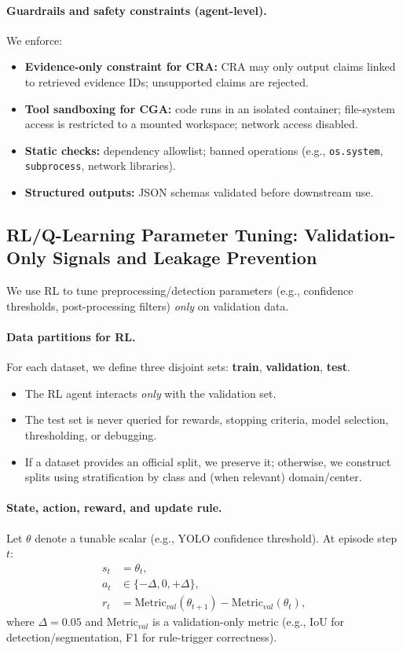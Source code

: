\documentclass{article}
\begin{document}
\paragraph{Guardrails and safety constraints (agent-level).}
We enforce:
\begin{itemize}
  \item \textbf{Evidence-only constraint for CRA:} CRA may only output claims linked to retrieved evidence IDs; unsupported claims are rejected.
  \item \textbf{Tool sandboxing for CGA:} code runs in an isolated container; file-system access is restricted to a mounted workspace; network access disabled.
  \item \textbf{Static checks:} dependency allowlist; banned operations (e.g., \texttt{os.system}, \texttt{subprocess}, network libraries).
  \item \textbf{Structured outputs:} JSON schemas validated before downstream use.
\end{itemize}

\subsection{RL/Q-Learning Parameter Tuning: Validation-Only Signals and Leakage Prevention}
\label{app:rl_details}

We use RL to tune preprocessing/detection parameters (e.g., confidence thresholds, post-processing filters) \emph{only} on validation data.

\paragraph{Data partitions for RL.}
For each dataset, we define three disjoint sets: \textbf{train}, \textbf{validation}, \textbf{test}.
\begin{itemize}
  \item The RL agent interacts \emph{only} with the validation set.
  \item The test set is never queried for rewards, stopping criteria, model selection, thresholding, or debugging.
  \item If a dataset provides an official split, we preserve it; otherwise, we construct splits using stratification by class and (when relevant) domain/center.
\end{itemize}

\paragraph{State, action, reward, and update rule.}
Let $\theta$ denote a tunable scalar (e.g., YOLO confidence threshold). At episode step $t$:
\begin{align}
  s_t &= \theta_t, \\
  a_t &\in \{-\Delta, 0, +\Delta\}, \\
  r_t &= \mathrm{Metric}_{val}(\theta_{t+1}) - \mathrm{Metric}_{val}(\theta_{t}),
\end{align}
where $\Delta=0.05$ and $\mathrm{Metric}_{val}$ is a validation-only metric (e.g., IoU for detection/segmentation, F1 for rule-trigger correctness).
\end{document}

